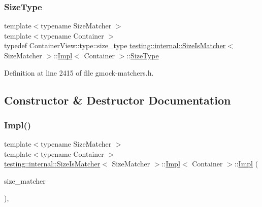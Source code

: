 \subsubsection{\texorpdfstring{Size\+Type}{SizeType}}
{\footnotesize\ttfamily template$<$typename Size\+Matcher $>$ \\
template$<$typename Container $>$ \\
typedef Container\+View\+::type\+::size\+\_\+type \hyperlink{classtesting_1_1internal_1_1SizeIsMatcher}{testing\+::internal\+::\+Size\+Is\+Matcher}$<$ Size\+Matcher $>$\+::\hyperlink{classtesting_1_1internal_1_1SizeIsMatcher_1_1Impl}{Impl}$<$ Container $>$\+::\hyperlink{classtesting_1_1internal_1_1SizeIsMatcher_1_1Impl_a5548da0c4c2245ca2fb520f44f0a687a}{Size\+Type}}



Definition at line 2415 of file gmock-\/matchers.\+h.



\subsection{Constructor \& Destructor Documentation}
\mbox{\label{classtesting_1_1internal_1_1SizeIsMatcher_1_1Impl_aa5279c8598ec8982546350fb442223f3}} 
\subsubsection{\texorpdfstring{Impl()}{Impl()}}
{\footnotesize\ttfamily template$<$typename Size\+Matcher $>$ \\
template$<$typename Container $>$ \\
\hyperlink{classtesting_1_1internal_1_1SizeIsMatcher}{testing\+::internal\+::\+Size\+Is\+Matcher}$<$ Size\+Matcher $>$\+::\hyperlink{classtesting_1_1internal_1_1SizeIsMatcher_1_1Impl}{Impl}$<$ Container $>$\+::\hyperlink{classtesting_1_1internal_1_1SizeIsMatcher_1_1Impl}{Impl} (\begin{DoxyParamCaption}\item[{const Size\+Matcher \&}]{size\+\_\+matcher }\end{DoxyParamCaption})\hspace{0.3cm}{\ttfamily [inline]}, {\ttfamily [explicit]}}



